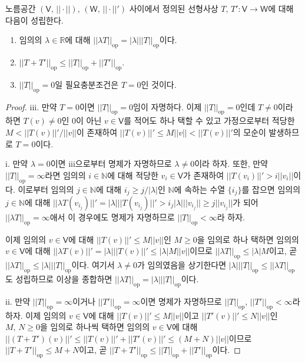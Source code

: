 \begin{proposition}\label{prop:opNormProp}
    노름공간 $(\mathsf{V},\,||\cdot||),\,(\mathsf{W},\,||\cdot||')$ 사이에서 정의된 선형사상 $T,\,T':\mathsf{V}\to\mathsf{W}$에 대해 다음이 성립한다.
    \begin{enumerate}
        \item 임의의 $\lambda\in\mathbb{R}$에 대해 $||\lambda T||_\mathrm{op}=|\lambda|||T||_\mathrm{op}$이다.
        \item $||T+T'||_\mathrm{op}\leq||T||_\mathrm{op}+||T'||_\mathrm{op}$.
        \item $||T||_\mathrm{op}=0$일 필요충분조건은 $T=0$인 것이다.
    \end{enumerate}
\end{proposition}

\begin{proof}
    iii. 만약 $T=0$이면 $||T||_\mathrm{op}=0$임이 자명하다. 이제 $||T||_\mathrm{op}=0$인데 $T\ne0$이라 하면 $T(v)\ne0$인 $0$이 아닌 $v\in\mathsf{V}$를 적어도 하나 택할 수 있고 가정으로부터 적당한 $M<||T(v)||'/||v||$이 존재하여 $||T(v)||'\leq M||v||<||T(v)||'$의 모순이 발생하므로 $T=0$이다.

    i. 만약 $\lambda=0$이면 iii으로부터 명제가 자명하므로 $\lambda\ne0$이라 하자. 또한, 만약 $||T||_\mathrm{op}=\infty$라면 임의의 $i\in\mathbb{N}$에 대해 적당한 $v_i\in\mathsf{V}$가 존재하여 $||T(v_i)||'>i||v_i||$이다. 이로부터 임의의 $j\in\mathbb{N}$에 대해 $i_j\geq j/|\lambda|$인 $\mathbb{N}$에 속하는 수열 $\{i_j\}$를 잡으면 임의의 $j\in\mathbb{N}$에 대해 $||\lambda T(v_{i_j})||'=|\lambda|||T(v_{i_j})||'>i_j|\lambda|||v_{i_j}||\geq j||v_{i_j}||$가 되어 $||\lambda T||_\mathrm{op}=\infty$애서 이 경우에도 명제가 자명하므로 $||T||_\mathrm{op}<\infty$라 하자.

    이제 임의의 $v\in\mathsf{V}$에 대해 $||T(v)||'\leq M||v||$인 $M\geq0$을 임의로 하나 택하면 임의의 $v\in\mathsf{V}$에 대해 $||\lambda T(v)||'=|\lambda|||T(v)||'\leq|\lambda|M||v||$이므로 $||\lambda T||_\mathrm{op}\leq|\lambda|M$이고, 곧 $||\lambda T||_\mathrm{op}\leq|\lambda|||T||_\mathrm{op}$이다. 여기서 $\lambda\ne0$가 임의였음을 상기한다면 $|\lambda|||T||_\mathrm{op}\leq||\lambda T||_\mathrm{op}$도 성립하므로 이상을 종합하면 $||\lambda T||_\mathrm{op}=|\lambda|||T||_\mathrm{op}$이다.

    ii. 만약 $||T||_\mathrm{op}=\infty$이거나 $||T'||_\mathrm{op}=\infty$이면 명제가 자명하므로 $||T||_\mathrm{op},\,||T'||_\mathrm{op}<\infty$라 하자. 이제 임의의 $v\in\mathsf{V}$에 대해 $||T(v)||'\leq M||v||$이고 $||T'(v)||'\leq N||v||$인 $M,\,N\geq0$을 임의로 하나씩 택하면 임의의 $v\in\mathsf{V}$에 대해 $||(T+T')(v)||'\leq||T(v)||'+||T'(v)||'\leq(M+N)||v||$이므로 $||T+T'||_\mathrm{op}\leq M+N$이고, 곧 $||T+T'||_\mathrm{op}\leq||T||_\mathrm{op}+||T'||_\mathrm{op}$이다.
\end{proof}

